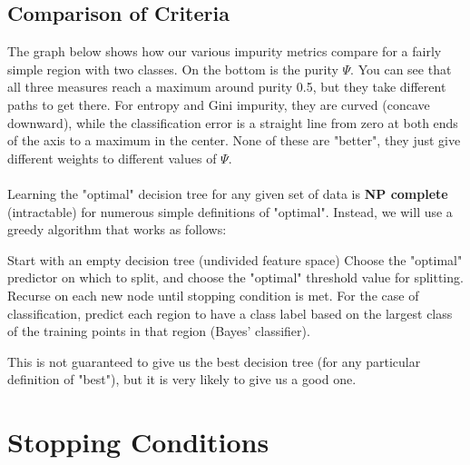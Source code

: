 \documentclass[10pt,a4paper]{report}
\begin{document}
\subsection{Comparison of Criteria}
The graph below shows how our various impurity metrics compare for a fairly simple region with two classes. On the bottom is the purity $\Psi$. 
You can see that all three measures reach a maximum around purity 0.5, but they take different paths to get there. For entropy and Gini impurity, they are curved (concave downward), while the classification error is a straight line from zero at both ends of the axis to a maximum in the center. None of these are "better", they just give different weights to different values of $\Psi$.\\
\\
Learning the "optimal" decision tree for any given set of data is \textbf{NP complete} (intractable) for numerous simple definitions of "optimal". Instead, we will use a greedy algorithm that works as follows:
\begin{algorithm}[H]
\begin{algorithmic}[1]
   \State Start with an empty decision tree (undivided feature space)
   \State Choose the "optimal" predictor on which to split, and choose the "optimal" threshold value for splitting.
	\State Recurse on each new node until stopping condition is met.
	\State For the case of classification, predict each region to have a class label based on the largest class of the training points in that region (Bayes' classifier).
\end{algorithmic}
\end{algorithm}
This is not guaranteed to give us the best decision tree (for any particular definition of "best"), but it is very likely to give us a good one.
\section{Stopping Conditions}
\end{document}
